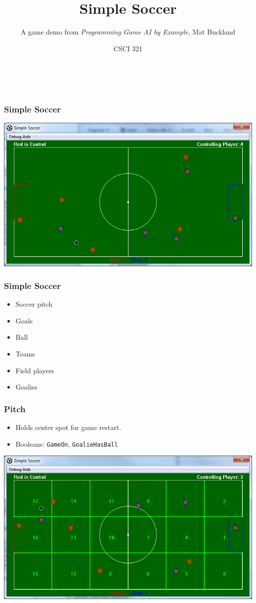 \documentclass[handout,t,compress]{beamer}
\title{Simple Soccer}
\subtitle{A game demo from {\em Programming Game AI by Example}, Mat Buckland}
\author{CSCI 321}
\institute{WWU}
\newcommand{\bframe}[1]{\begin{frame}[fragile]\frametitle{#1}}
\begin{document}
\small

\bframe{~}
\titlepage
\end{frame}

\bframe{Simple Soccer}
\includegraphics[scale=0.4]{simplesoccergame.png}
\end{frame}

\bframe{Simple Soccer}
\begin{itemize}
\item Soccer pitch
\item Goals
\item Ball
\item Teams
\item Field players
\item Goalies
\end{itemize}
\end{frame}

\bframe{Pitch}
\begin{itemize}
\item  Holds center spot for game restart.
\item Booleans:  {\tt GameOn}, {\tt GoalieHasBall}
\end{itemize}
\includegraphics[scale=0.4]{simplesoccerregions.png}
\end{frame}
\end{document}
